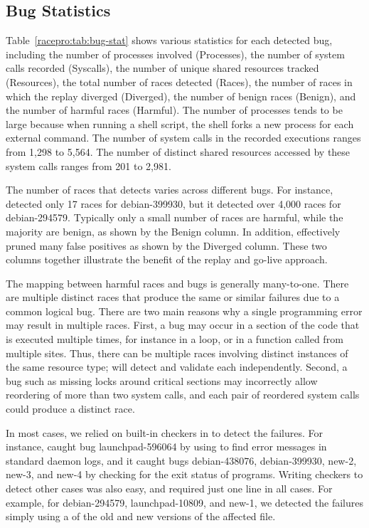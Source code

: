 \subsection{Bug Statistics} \label{racepro:sec:race}

Table~\ref{racepro:tab:bug-stat} shows various statistics for each detected
bug, including the number of processes involved (Processes), the
number of system calls recorded (Syscalls), the number of unique 
shared resources tracked (Resources), the total number of races
detected (Races), the number of races in which the replay diverged
(Diverged), the number of benign races (Benign), and the number of
harmful races (Harmful).  
The number of processes tends to be large because when running a shell
script, the shell forks a new process for each external command.  The
number of system calls in the recorded executions ranges from 1,298 to
5,564. The number of distinct shared resources accessed by these
system calls ranges from 201 to 2,981.

The number of races that \racepro detects varies across different bugs.
For instance, \racepro detected only 17 races for debian-399930, but it
detected over 4,000 races for debian-294579.  Typically only a small
number of races are harmful, while the majority are
benign, as shown by the Benign column.  In addition, \racepro effectively
pruned many false positives as shown by the Diverged column.  
These two columns together illustrate the benefit of the replay and
go-live approach.

The mapping between harmful races and bugs is generally many-to-one.
There are multiple distinct races that produce the same or similar
failures due to a common logical bug. There are two main reasons why a
single programming error may result in multiple races. First, a bug
may occur in a section of the code that is executed multiple times,
for instance in a loop, or in a function called from multiple sites.
Thus, there can be multiple races involving distinct instances of the
same resource type; \racepro will detect and validate each independently.
Second, a bug such as missing locks around critical sections may
incorrectly allow reordering of more than two system calls, and each
pair of reordered system calls could produce a distinct race.

In most cases, we relied on built-in checkers in \racepro to detect the
failures. For instance, \racepro caught bug launchpad-596064 by using
 to find error messages in standard daemon logs, and it caught
bugs debian-438076, debian-399930, new-2, new-3, and new-4 by checking
for the exit status of programs.  Writing checkers to detect other
cases was also easy, and required just one line in all cases. For
example, for debian-294579, launchpad-10809, and new-1, we detected
the failures simply using a  of the old and new versions of
the affected file.

